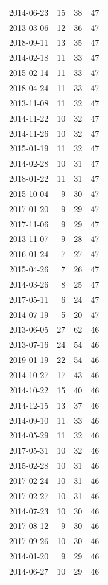 \begin{tabular}{lrrr}
2014-06-23 & 15 & 38 & 47 \\
2013-03-06 & 12 & 36 & 47 \\
2018-09-11 & 13 & 35 & 47 \\
2014-02-18 & 11 & 33 & 47 \\
2015-02-14 & 11 & 33 & 47 \\
2018-04-24 & 11 & 33 & 47 \\
2013-11-08 & 11 & 32 & 47 \\
2014-11-22 & 10 & 32 & 47 \\
2014-11-26 & 10 & 32 & 47 \\
2015-01-19 & 11 & 32 & 47 \\
2014-02-28 & 10 & 31 & 47 \\
2018-01-22 & 11 & 31 & 47 \\
2015-10-04 & 9 & 30 & 47 \\
2017-01-20 & 9 & 29 & 47 \\
2017-11-06 & 9 & 29 & 47 \\
2013-11-07 & 9 & 28 & 47 \\
2016-01-24 & 7 & 27 & 47 \\
2015-04-26 & 7 & 26 & 47 \\
2014-03-26 & 8 & 25 & 47 \\
2017-05-11 & 6 & 24 & 47 \\
2014-07-19 & 5 & 20 & 47 \\
2013-06-05 & 27 & 62 & 46 \\
2013-07-16 & 24 & 54 & 46 \\
2019-01-19 & 22 & 54 & 46 \\
2014-10-27 & 17 & 43 & 46 \\
2014-10-22 & 15 & 40 & 46 \\
2014-12-15 & 13 & 37 & 46 \\
2014-09-10 & 11 & 33 & 46 \\
2014-05-29 & 11 & 32 & 46 \\
2017-05-31 & 10 & 32 & 46 \\
2015-02-28 & 10 & 31 & 46 \\
2017-02-24 & 10 & 31 & 46 \\
2017-02-27 & 10 & 31 & 46 \\
2014-07-23 & 10 & 30 & 46 \\
2017-08-12 & 9 & 30 & 46 \\
2017-09-26 & 10 & 30 & 46 \\
2014-01-20 & 9 & 29 & 46 \\
2014-06-27 & 10 & 29 & 46 \\

\end{tabular}
